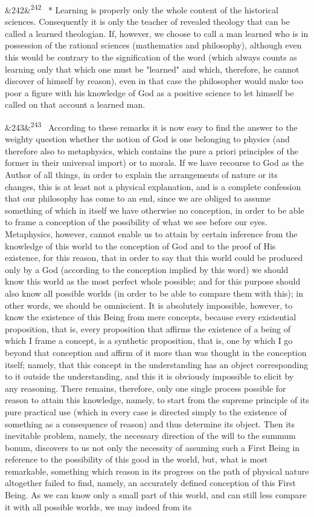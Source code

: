 \documentclass[12pt]{article}
\newcommand{\para}[1][]{\par\noindent\ifx&#1&\else\textsuperscript{\footnotesize #1}~\fi}
\begin{document}
\para[242] * Learning is properly only the whole content of the historical sciences. Consequently it is only the teacher of revealed theology that can be called a learned theologian. If, however, we choose to call a man learned who is in possession of the rational sciences (mathematics and philosophy), although even this would be contrary to the signification of the word (which always counts as learning only that which one must be "learned" and which, therefore, he cannot discover of himself by reason), even in that case the philosopher would make too poor a figure with his knowledge of God as a positive science to let himself be called on that account a learned man.

\para[243] According to these remarks it is now easy to find the answer to the weighty question whether the notion of God is one belonging to physics (and therefore also to metaphysics, which contains the pure a priori principles of the former in their universal import) or to morals. If we have recourse to God as the Author of all things, in order to explain the arrangements of nature or its changes, this is at least not a physical explanation, and is a complete confession that our philosophy has come to an end, since we are obliged to assume something of which in itself we have otherwise no conception, in order to be able to frame a conception of the possibility of what we see before our eyes. Metaphysics, however, cannot enable us to attain by certain inference from the knowledge of this world to the conception of God and to the proof of His existence, for this reason, that in order to say that this world could be produced only by a God (according to the conception implied by this word) we should know this world as the most perfect whole possible; and for this purpose should also know all possible worlds (in order to be able to compare them with this); in other words, we should be omniscient. It is absolutely impossible, however, to know the existence of this Being from mere concepts, because every existential proposition, that is, every proposition that affirms the existence of a being of which I frame a concept, is a synthetic proposition, that is, one by which I go beyond that conception and affirm of it more than was thought in the conception itself; namely, that this concept in the understanding has an object corresponding to it outside the understanding, and this it is obviously impossible to elicit by any reasoning. There remains, therefore, only one single process possible for reason to attain this knowledge, namely, to start from the supreme principle of its pure practical use (which in every case is directed simply to the existence of something as a consequence of reason) and thus determine its object. Then its inevitable problem, namely, the necessary direction of the will to the summum bonum, discovers to us not only the necessity of assuming such a First Being in reference to the possibility of this good in the world, but, what is most remarkable, something which reason in its progress on the path of physical nature altogether failed to find, namely, an accurately defined conception of this First Being. As we can know only a small part of this world, and can still less compare it with all possible worlds, we may indeed from its 
\end{document}
